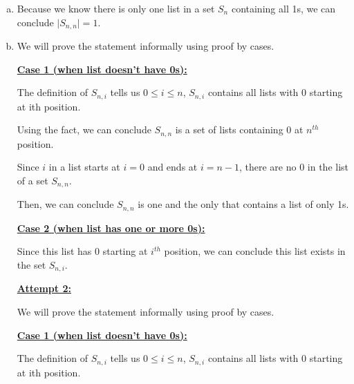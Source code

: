 \documentclass[12pt]{article}
\begin{document}
\begin{enumerate}[a.]
\begin{mdframed}
    \end{mdframed}

    \item

    Because we know there is only one list in a set $S_{n}$ containing all 1s, we can conclude
    $\lvert S_{n,n} \rvert = 1$.

    \item

    We will prove the statement informally using proof by cases.

    \bigskip

    \underline{\textbf{Case 1 (when list doesn’t have 0s):}}

    \bigskip

    The definition of $S_{n,i}$ tells us $0 \leq i \leq n$, $S_{n,i}$ contains
    all lists with 0 starting at ith position.

    \bigskip

    Using the fact, we can conclude $S_{n,n}$ is a set of lists containing 0 at $n^{th}$
    position.

    \bigskip

    Since $i$ in a list starts at $i = 0$ and ends at $i = n-1$, there are no 0
    in the list of a set $S_{n,n}$.

    \bigskip

    Then, we can conclude $S_{n,n}$ is one and the only that contains a list of only 1s.

    \bigskip

    \underline{\textbf{Case 2 (when list has one or more 0s):}}

    \bigskip

    Since this list has 0 starting at $i^{th}$ position, we can conclude this list
    exists in the set $S_{n,i}$.

    \bigskip

    \begin{mdframed}
        \underline{\textbf{Attempt 2:}}

        \bigskip

        We will prove the statement informally using proof by cases.

        \bigskip

        \underline{\textbf{Case 1 (when list doesn’t have 0s):}}

        \bigskip

        The definition of $S_{n,i}$ tells us $0 \leq i \leq n$, $S_{n,i}$ contains
        all lists with 0 starting at ith position.


\end{mdframed}
\end{enumerate}
\end{document}
